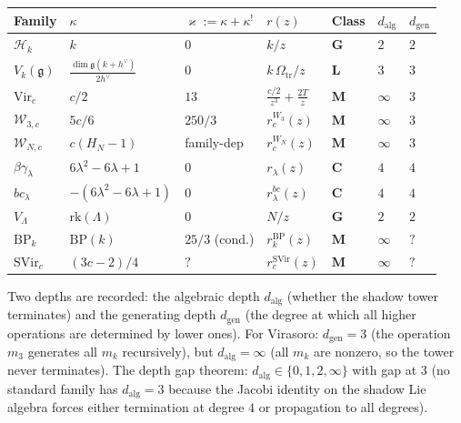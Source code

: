 \documentclass[11pt,reqno]{amsart}
\theoremstyle{definition}
\theoremstyle{remark}
\providecommand{\cH}{\mathcal{H}}
\providecommand{\cW}{\mathcal{W}}
\providecommand{\fg}{\mathfrak{g}}
\providecommand{\Vir}{\mathrm{Vir}}
\numberwithin{equation}{section}
\begin{document}
\begin{center}
\small
\renewcommand{\arraystretch}{1.2}
\begin{tabular}{lllllll}
\textbf{Family} & $\kappa$ & $\varkappa := \kappa + \kappa^!$ & $r(z)$
 & Class & $d_{\mathrm{alg}}$ & $d_{\mathrm{gen}}$\\ \hline
$\cH_k$ & $k$ & $0$ & $k/z$ & $\mathbf G$ & $2$ & $2$\\
$V_k(\fg)$ & $\frac{\dim\fg(k+h^\vee)}{2h^\vee}$ & $0$
 & $k\,\Omega_{\mathrm{tr}}/z$ & $\mathbf L$ & $3$ & $3$\\
$\Vir_c$ & $c/2$ & $13$ & $\frac{c/2}{z^3}+\frac{2T}{z}$
 & $\mathbf M$ & $\infty$ & $3$\\
$\cW_{3,c}$ & $5c/6$ & $250/3$ & $r_c^{W_3}(z)$
 & $\mathbf M$ & $\infty$ & $3$\\
$\cW_{N,c}$ & $c(H_N{-}1)$ & family-dep & $r_c^{W_N}(z)$
 & $\mathbf M$ & $\infty$ & $3$\\
$\beta\gamma_\lambda$ & $6\lambda^2{-}6\lambda{+}1$ & $0$
 & $r_\lambda(z)$ & $\mathbf C$ & $4$ & $4$\\
$bc_\lambda$ & $-(6\lambda^2{-}6\lambda{+}1)$ & $0$
 & $r_\lambda^{bc}(z)$ & $\mathbf C$ & $4$ & $4$\\
$V_\Lambda$ & $\mathrm{rk}(\Lambda)$ & $0$ & $N/z$
 & $\mathbf G$ & $2$ & $2$\\
$\mathrm{BP}_k$ & $\mathrm{BP}(k)$ & $25/3$ (cond.) & $r_k^{\mathrm{BP}}(z)$
 & $\mathbf M$ & $\infty$ & $?$\\
$\mathrm{SVir}_c$ & $(3c-2)/4$ & $?$
 & $r_c^{\mathrm{SVir}}(z)$ & $\mathbf M$ & $\infty$ & $?$
\end{tabular}
\end{center}

\noindent
Two depths are recorded: the algebraic depth $d_{\mathrm{alg}}$
(whether the shadow tower terminates) and the generating depth
$d_{\mathrm{gen}}$ (the degree at which all higher operations are
determined by lower ones). For Virasoro: $d_{\mathrm{gen}} = 3$
(the operation $m_3$ generates all $m_k$ recursively), but
$d_{\mathrm{alg}} = \infty$ (all $m_k$ are nonzero, so the tower
never terminates). The depth gap theorem: $d_{\mathrm{alg}} \in
\{0, 1, 2, \infty\}$ with gap at $3$ (no standard family has
$d_{\mathrm{alg}} = 3$ because the Jacobi identity on the shadow
Lie algebra forces either termination at degree $4$ or
propagation to all degrees).
\end{document}
